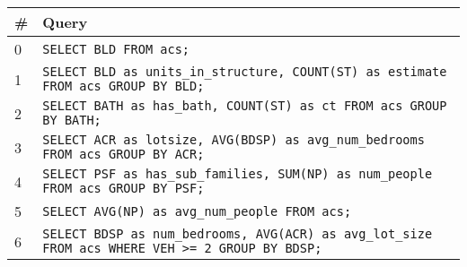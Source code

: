 \begin{tabular}{ll}
\toprule
\# & Query \\
\midrule
0 & \verb|SELECT BLD FROM acs;| \label{q0} \\
1 & \verb|SELECT BLD as units_in_structure, COUNT(ST) as estimate FROM acs GROUP BY BLD;| \label{q1} \\
2 & \verb|SELECT BATH as has_bath, COUNT(ST) as ct FROM acs GROUP BY BATH;| \label{q2} \\
3 & \verb|SELECT ACR as lotsize, AVG(BDSP) as avg_num_bedrooms FROM acs GROUP BY ACR;| \label{q3} \\
4 & \verb|SELECT PSF as has_sub_families, SUM(NP) as num_people FROM acs GROUP BY PSF;| \label{q4} \\
5 & \verb|SELECT AVG(NP) as avg_num_people FROM acs;| \label{q5} \\
6 & \verb|SELECT BDSP as num_bedrooms, AVG(ACR) as avg_lot_size FROM acs WHERE VEH >= 2 GROUP BY BDSP;| \label{q6} \\
\bottomrule
\end{tabular}
